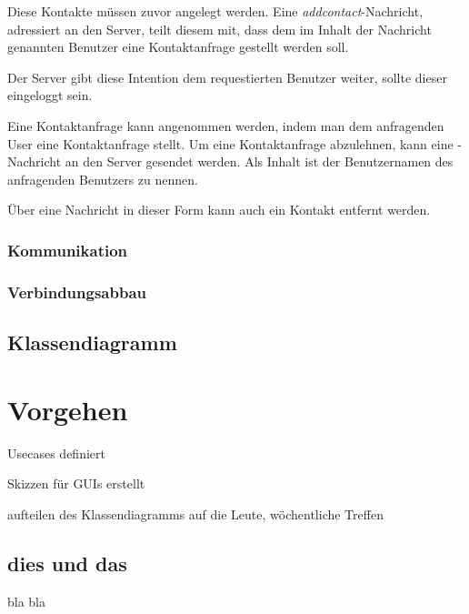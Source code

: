 \documentclass[12pt,a4paper,bibliography=totocnumbered,listof=totocnumbered]{scrartcl}
\begin{document}
Diese Kontakte müssen zuvor angelegt werden. Eine \textit{addcontact}-Nachricht, adressiert an den Server, teilt diesem mit, dass dem im Inhalt der Nachricht genannten Benutzer eine Kontaktanfrage gestellt werden soll.

Der Server gibt diese Intention dem requestierten Benutzer weiter, sollte dieser eingeloggt sein.

Eine Kontaktanfrage kann angenommen werden, indem man dem anfragenden User eine Kontaktanfrage stellt.
Um eine Kontaktanfrage abzulehnen, kann eine -Nachricht an den Server gesendet werden. Als Inhalt ist der Benutzernamen des anfragenden Benutzers zu nennen.


Über eine Nachricht in dieser Form kann auch ein Kontakt entfernt werden.

\subsubsection{Kommunikation}

\subsubsection{Verbindungsabbau}

\subsection{Klassendiagramm}

\section{Vorgehen}
Usecases definiert

Skizzen für GUIs erstellt

aufteilen des Klassendiagramms auf die Leute, wöchentliche Treffen


\subsection{dies und das}
bla bla

\end{document}
